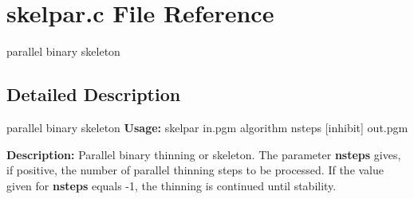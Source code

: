 \section{skelpar.c File Reference}
\label{skelpar_8c}


parallel binary skeleton  




\subsection{Detailed Description}
parallel binary skeleton {\bfseries Usage:} skelpar in.pgm algorithm nsteps [inhibit] out.pgm

{\bfseries Description:} Parallel binary thinning or skeleton. The parameter {\bfseries nsteps} gives, if positive, the number of parallel thinning steps to be processed. If the value given for {\bfseries nsteps} equals -\/1, the thinning is continued until stability.

